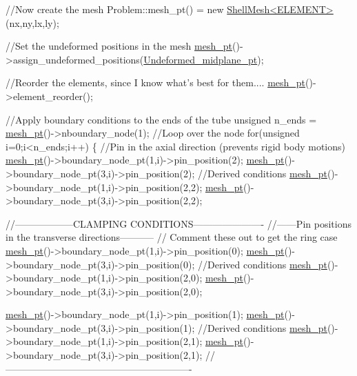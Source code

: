 \begin{DoxyCodeInclude}
 \textcolor{comment}{//Now create the mesh}
 Problem::mesh\_pt() = \textcolor{keyword}{new} \hyperlink{classShellMesh}{ShellMesh<ELEMENT>}(nx,ny,lx,ly); 

 \textcolor{comment}{//Set the undeformed positions in the mesh}
 \hyperlink{classShellProblem_a1905a1b913469ed54f7c8f55d133ff57}{mesh\_pt}()->assign\_undeformed\_positions(\hyperlink{classShellProblem_a1c9e4492c7c7c2716fdf8b812ec41651}{Undeformed\_midplane\_pt});

 \textcolor{comment}{//Reorder the elements, since I know what's best for them....}
 \hyperlink{classShellProblem_a1905a1b913469ed54f7c8f55d133ff57}{mesh\_pt}()->element\_reorder();

 \textcolor{comment}{//Apply boundary conditions to the ends of the tube}
 \textcolor{keywordtype}{unsigned} n\_ends = \hyperlink{classShellProblem_a1905a1b913469ed54f7c8f55d133ff57}{mesh\_pt}()->nboundary\_node(1);
 \textcolor{comment}{//Loop over the node}
 \textcolor{keywordflow}{for}(\textcolor{keywordtype}{unsigned} i=0;i<n\_ends;i++)
  \{
   \textcolor{comment}{//Pin in the axial direction (prevents rigid body motions)}
   \hyperlink{classShellProblem_a1905a1b913469ed54f7c8f55d133ff57}{mesh\_pt}()->boundary\_node\_pt(1,i)->pin\_position(2);
   \hyperlink{classShellProblem_a1905a1b913469ed54f7c8f55d133ff57}{mesh\_pt}()->boundary\_node\_pt(3,i)->pin\_position(2);
   \textcolor{comment}{//Derived conditions}
   \hyperlink{classShellProblem_a1905a1b913469ed54f7c8f55d133ff57}{mesh\_pt}()->boundary\_node\_pt(1,i)->pin\_position(2,2);
   \hyperlink{classShellProblem_a1905a1b913469ed54f7c8f55d133ff57}{mesh\_pt}()->boundary\_node\_pt(3,i)->pin\_position(2,2);

   \textcolor{comment}{//------------------CLAMPING CONDITIONS----------------------}
   \textcolor{comment}{//------Pin positions in the transverse directions-----------}
   \textcolor{comment}{// Comment these out to get the ring case}
   \hyperlink{classShellProblem_a1905a1b913469ed54f7c8f55d133ff57}{mesh\_pt}()->boundary\_node\_pt(1,i)->pin\_position(0);
   \hyperlink{classShellProblem_a1905a1b913469ed54f7c8f55d133ff57}{mesh\_pt}()->boundary\_node\_pt(3,i)->pin\_position(0);
   \textcolor{comment}{//Derived conditions}
   \hyperlink{classShellProblem_a1905a1b913469ed54f7c8f55d133ff57}{mesh\_pt}()->boundary\_node\_pt(1,i)->pin\_position(2,0);
   \hyperlink{classShellProblem_a1905a1b913469ed54f7c8f55d133ff57}{mesh\_pt}()->boundary\_node\_pt(3,i)->pin\_position(2,0);

   \hyperlink{classShellProblem_a1905a1b913469ed54f7c8f55d133ff57}{mesh\_pt}()->boundary\_node\_pt(1,i)->pin\_position(1);
   \hyperlink{classShellProblem_a1905a1b913469ed54f7c8f55d133ff57}{mesh\_pt}()->boundary\_node\_pt(3,i)->pin\_position(1);
   \textcolor{comment}{//Derived conditions}
   \hyperlink{classShellProblem_a1905a1b913469ed54f7c8f55d133ff57}{mesh\_pt}()->boundary\_node\_pt(1,i)->pin\_position(2,1);
   \hyperlink{classShellProblem_a1905a1b913469ed54f7c8f55d133ff57}{mesh\_pt}()->boundary\_node\_pt(3,i)->pin\_position(2,1);
   \textcolor{comment}{//----------------------------------------------------------}


\end{DoxyCodeInclude}
